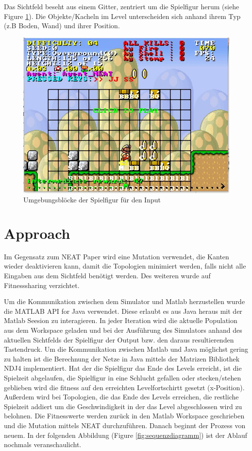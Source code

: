 \documentclass{hbrs-ecta-report}
\begin{document}
Das Sichtfeld beseht aus einem Gitter, zentriert um die Spielfigur herum (siehe Figure \ref{fig:MarioInput}). Die Objekte/Kacheln im Level unterscheiden sich anhand ihrem Typ (z.B Boden, Wand) und ihrer Position.

\begin{figure}[h!]
	\centering
	\includegraphics[width=\linewidth]{img/MarioInput.jpg}
	\caption{Umgebungsblöcke der Spielfigur für den Input}
	\label{fig:MarioInput} 
\end{figure}

\FloatBarrier


\section{Approach}
Im Gegensatz zum NEAT Paper \cite{Stanley2002a} wird eine Mutation verwendet, die Kanten wieder deaktivieren kann, damit die Topologien minimiert werden, falls nicht alle Eingaben aus dem Sichtfeld benötigt werden. 
Des weiteren wurde auf Fitnesssharing verzichtet.


Um die Kommunikation zwischen dem Simulator und Matlab herzustellen wurde die MATLAB API for Java verwendet. Diese erlaubt es aus Java heraus mit der Matlab Seesion zu interagieren.
In jeder Iteration wird die aktuelle Population aus dem Workspace geladen und bei der Ausführung des Simulators anhand des aktuellen Sichtfelds der Spielfigur der Output bzw. den daraus resultierenden Tastendruck. 
Um die Kommunikation zwischen Matlab und Java möglichst gering zu halten ist die Berechnung der Netze in Java mittels der Matrizen Bibliothek NDJ4 %
implementiert. 
Hat der die Spielfigur das Ende des Levels erreicht, ist die Spielzeit abgelaufen, die Spielfigur in eine Schlucht gefallen oder stecken/stehen geblieben wird die fitness auf den erreichten Levelfortschirtt gesetzt (x-Position). Außerdem wird bei Topologien, die das Ende des Levels erreichen, die restliche Spielzeit addiert um die Geschwindigkeit in der das Level abgeschlossen wird zu belohnen. Die Fitnesswerte werden zurück in den Matlab Workspace geschrieben und die Mutation mittels NEAT durchzuführen. Danach beginnt der Prozess von neuem. 
In der folgenden Abbildung (Figure \ref{fig:sequenzdiagramm}) ist der Ablauf nochmals veranschaulicht.
\end{document}
